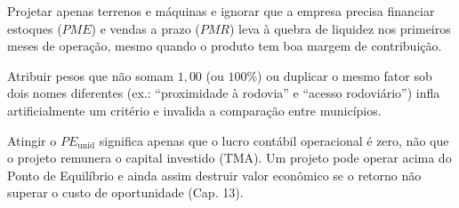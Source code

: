 \begin{boxErro}
Projetar apenas terrenos e máquinas e ignorar que a empresa precisa financiar estoques ($PME$) e vendas a prazo ($PMR$) leva à quebra de liquidez nos primeiros meses de operação, mesmo quando o produto tem boa margem de contribuição.
\end{boxErro}

\begin{boxErro}
Atribuir pesos que não somam $1{,}00$ (ou $100\%$) ou duplicar o mesmo fator sob dois nomes diferentes (ex.: ``proximidade à rodovia'' e ``acesso rodoviário'') infla artificialmente um critério e invalida a comparação entre municípios.
\end{boxErro}

\begin{boxErro}
Atingir o $PE_{\text{unid}}$ significa apenas que o lucro contábil operacional é zero, não que o projeto remunera o capital investido (TMA). Um projeto pode operar acima do Ponto de Equilíbrio e ainda assim destruir valor econômico se o retorno não superar o custo de oportunidade (Cap. 13).
\end{boxErro}


